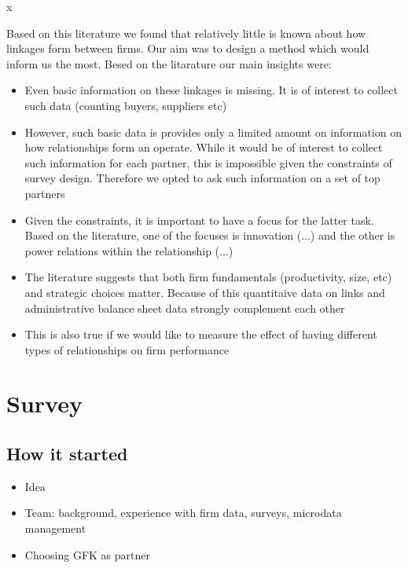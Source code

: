 x\documentclass[final, dvipsnames, authoryear,12pt]{elsarticle}
\begin{document}
Based on this literature we found that relatively little is known about how linkages form between firms. Our aim was to design a method which would inform us the most. Besed on the litarature our main insights were:
\begin{itemize}
    \item Even basic information on these linkages is missing. It is of interest to collect such data (counting buyers, suppliers etc)
    \item However, such basic data is provides only a limited amount on information on how relationships form an operate. While it would be of interest to collect such information for each partner, this is impossible given the constraints of survey design. Therefore we opted to ask such information on a set of top partners
    \item Given the constraints, it is important to have a focus for the latter task. Based on the literature, one of the focuses is innovation (...) and the other is power relations within the relationship (...)    
    \item The literature suggests that both firm fundamentals (productivity, size, etc) and strategic choices matter. Because of this quantitaive data on links and administrative balance sheet data strongly complement each other
    \item This is also true if we would like to measure the effect of having different types of relationships on firm performance

    
\end{itemize}{}

\section{ Survey}
\subsection{How it started}


\begin{itemize}
    \item Idea
    \item Team: background, experience with firm data, surveys, microdata management
    \item Choosing GFK as partner
\end{itemize}{}
\end{document}
